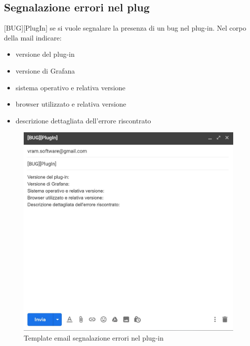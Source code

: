 	\subsection{Segnalazione errori nel plug}
 	[BUG][PlugIn] se si vuole segnalare la presenza di un bug nel plug-in.
 	Nel corpo della mail indicare:
 	\begin{itemize}
 		\item versione del plug-in
 		\item versione di Grafana
 		\item sistema operativo e relativa versione
 		\item browser utilizzato e relativa versione
 		\item descrizione dettagliata dell'errore riscontrato
 	\end{itemize}
 	\mbox{}
 	\begin{figure} [H]
 		\begin{center}
 			\includegraphics[width=120mm]{./img/erroriPlugIn.jpg}
 		\end{center}
 		\caption{Template email segnalazione errori nel plug-in}
 	\end{figure}